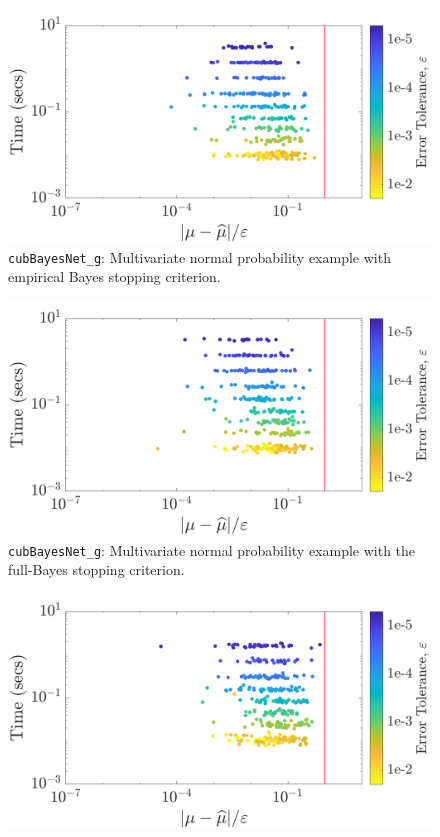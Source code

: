 \documentclass{iitthesis}          %
\newcommand{\code}[1]{\texttt{#1}}
\begin{document}
{{{{{{\begin{figure}
\centering
\includegraphics[width=0.95\linewidth]{"Sobol/Sobol_MVN_guaranteed_time_MLE__d2_r1_2019-Sep-1"}
\caption[Sobol: MVN guaranteed: MLE]{\code{cubBayesNet\_g}: Multivariate normal probability example with empirical Bayes stopping criterion.}
\label{fig:Sobol-mvn-guaranteed-MLE}
\end{figure}
\begin{figure}
\centering
\includegraphics[width=0.95\linewidth]{"Sobol/Sobol_MVN_guaranteed_time_full__d2_r1_2019-Sep-1"}
\caption[Sobol: MVN guaranteed: Full Bayes]{\code{cubBayesNet\_g}: Multivariate normal probability example with the full-Bayes stopping criterion.}
\label{fig:Sobol-mvn-guaranteed-FB}
\end{figure}
\begin{figure}
\centering
\includegraphics[width=0.95\linewidth]{"Sobol/Sobol_MVN_guaranteed_time_GCV__d2_r1_2019-Sep-1"}

\end{figure}}}}}}}
\end{document}

